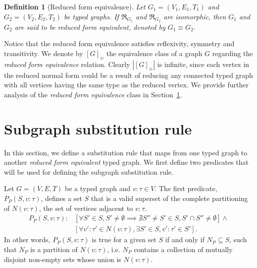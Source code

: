\documentclass[preprint,12pt]{elsarticle}
\theoremstyle{plain}
\newtheorem{definition}[theorem]{Definition}
\newcommand\tyv[2]{#1\!\!:\!\!#2}
\begin{document}
\begin{definition}[Reduced form equivalence]
Let $G_1 = (V_1,E_1,T_1)$ and $G_2 = (V_2,E_2,T_2)$ be typed graphs.
If $\Re_{G_1}$ and $\Re_{G_2}$ are isomorphic, then $G_1$ and $G_2$ are said to
be \textit{reduced form equivalent}, denoted by $G_1 \equiv G_2$.
\end{definition}

Notice that the reduced form equivalence satisfies reflexivity, symmetry and transitivity.
We denote by $[G]_\equiv$ the equivalence class
of a graph $G$ regarding the \textit{reduced form equivalence} relation.
Clearly $|[G]_\equiv|$ is infinite, since each vertex in the reduced normal form
could be a result of reducing any connected typed graph with all vertices having the same
type as the reduced vertex.
We provide further analysis of the \textit{reduced form equivalence} class
in Section~\ref{sec:substitution}.


\section{Subgraph substitution rule}\label{sec:substitution}

In this section, we define a substitution rule that maps from
one typed graph to another \textit{reduced form equivalent} typed graph.
We first define two predicates that will be used for defining the 
subgraph substitution rule.

Let $G = (V,E,T)$ be a typed graph and $\tyv{v}{\tau}\in V$.
The first predicate, $P_P(S, \tyv{v}{\tau})$, defines a set $S$ that is a valid superset of the complete partitioning of $N(\tyv{v}{\tau})$,
the set of vertices adjacent to $\tyv{v}{\tau}$.
\begin{equation*}
\begin{split}
P_P(S, \tyv{v}{\tau}): &[\forall S'\in S, S'\neq\emptyset \implies 
  \nexists S''\neq S' \in S, S'\cap S''\neq\emptyset]\wedge \\
  &[\forall \tyv{v'}{\tau'}\in N(\tyv{v}{\tau}), \exists S'\in S, \tyv{v'}{\tau'}\in S'].
\end{split}
\end{equation*}
In other words,
$P_P(S, \tyv{v}{\tau})$ is true for a given set $S$
if and only if
$N_P\subseteq S$, such that $N_P$ is a partition of $N(\tyv{v}{\tau})$,
i.e. $N_P$ contains 
a collection of mutually disjoint non-empty sets whose union is $N(\tyv{v}{\tau})$.
\end{document}
